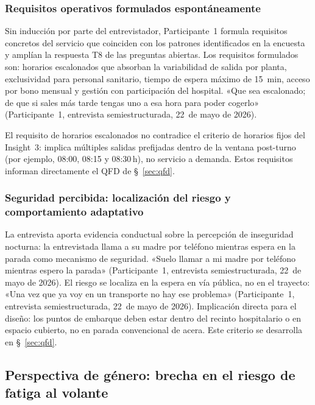\subsubsection{Requisitos operativos formulados espontáneamente}
\label{sec:requisitos-espontaneos}

Sin inducción por parte del entrevistador, Participante~1 formula requisitos concretos del servicio que coinciden con los patrones identificados en la encuesta y amplían la respuesta T8 de las preguntas abiertas. Los requisitos formulados son: horarios escalonados que absorban la variabilidad de salida por planta, exclusividad para personal sanitario, tiempo de espera máximo de 15~min, acceso por bono mensual y gestión con participación del hospital. «Que sea escalonado; de que si sales más tarde tengas uno a esa hora para poder cogerlo» (Participante~1, entrevista semiestructurada, 22~de mayo de 2026).

El requisito de horarios escalonados no contradice el criterio de horarios fijos del Insight~3: implica múltiples salidas prefijadas dentro de la ventana post-turno (por ejemplo, 08:00, 08:15 y 08:30\,h), no servicio a demanda. Estos requisitos informan directamente el \acs{QFD} de §~\ref{sec:qfd}.

\subsubsection{Seguridad percibida: localización del riesgo y comportamiento adaptativo}
\label{sec:seguridad-entrevista}

La entrevista aporta evidencia conductual sobre la percepción de inseguridad nocturna: la entrevistada llama a su madre por teléfono mientras espera en la parada como mecanismo de seguridad. «Suelo llamar a mi madre por teléfono mientras espero la parada» (Participante~1, entrevista semiestructurada, 22~de mayo de 2026). El riesgo se localiza en la espera en vía pública, no en el trayecto: «Una vez que ya voy en un transporte no hay ese problema» (Participante~1, entrevista semiestructurada, 22~de mayo de 2026). Implicación directa para el diseño: los puntos de embarque deben estar dentro del recinto hospitalario o en espacio cubierto, no en parada convencional de acera. Este criterio se desarrolla en §~\ref{sec:qfd}.

\subsection{Perspectiva de género: brecha en el riesgo de fatiga al volante}
\label{sec:perspectiva-genero}

